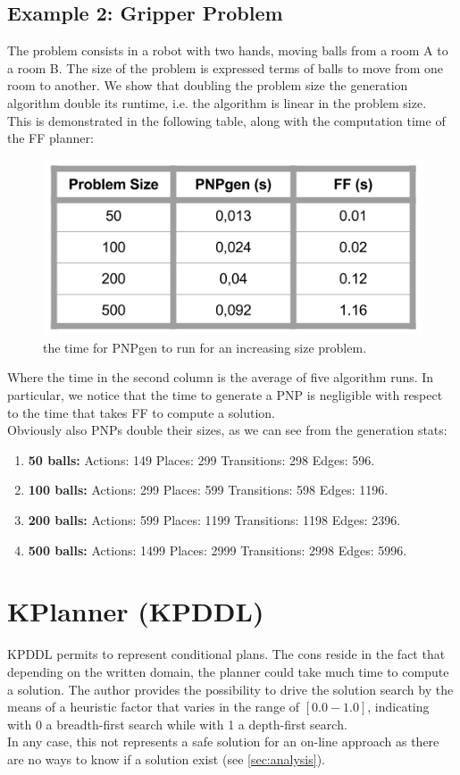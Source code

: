 \documentclass[pdftex,12pt,a4paper]{report}
\begin{document}
\subsection{Example 2: Gripper Problem}
The problem consists in a robot with two hands, moving balls from a room A to a room B. The size of the problem is expressed terms of balls to move from one room to another. We show that doubling the problem size the generation algorithm double its runtime, i.e. the algorithm is linear in the problem size.\\
This is demonstrated in the following table, along with the computation time of the FF planner:
\begin{figure}[H]
	\centering
	\includegraphics[scale=0.48]{images/gripper_pddl.png}
	\caption{the time for PNPgen to run for an increasing size problem.}
	\label{fig:gripper_pddl}
\end{figure}
\noindent Where the time in the second column is the average of five algorithm runs. In particular, we notice that the time to generate a PNP is negligible with respect to the time that takes FF to compute a solution.\\  
Obviously also PNPs double their sizes, as we can see from the generation stats:
\begin{enumerate}
\item \textbf{50 balls:} Actions: 149 Places: 299 Transitions: 298 Edges: 596.
\item \textbf{100 balls:} Actions: 299 Places: 599 Transitions: 598 Edges: 1196.
\item \textbf{200 balls:} Actions: 599 Places: 1199 Transitions: 1198 Edges: 2396.
\item \textbf{500 balls:} Actions: 1499 Places: 2999 Transitions: 2998 Edges: 5996.
\end{enumerate}

\newpage
\section{KPlanner (KPDDL)}
\noindent KPDDL permits to represent conditional plans. The cons reside in the fact that depending on the written domain, the planner could take much time to compute a solution. The author provides the possibility to drive the solution search by the means of a heuristic factor that varies in the range of $[0.0 - 1.0]$, indicating with 0 a breadth-first search while with 1 a depth-first search.\\ 
In any case, this not represents a safe solution for an on-line approach as there are no ways to know if a solution exist (see \ref{sec:analysis}).
\end{document}
